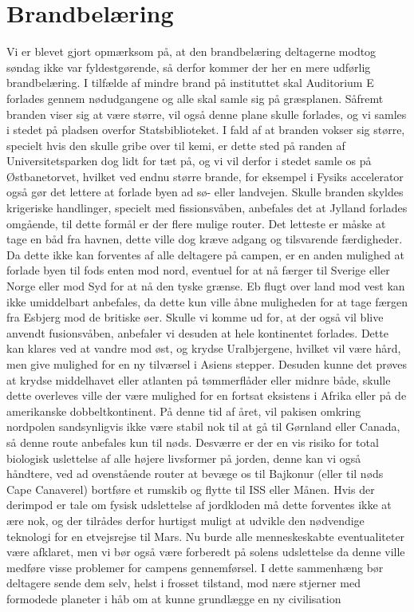 

\begin{minipage}[b]{0.95\linewidth}
\begin{minipage}[t]{0.47\textwidth}
\vspace{3mm}
\section*{Brandbelæring}
Vi er blevet gjort opmærksom på, at den brandbelæring deltagerne modtog søndag ikke var fyldestgørende, så derfor kommer der her en mere udførlig brandbelæring. I tilfælde af mindre brand på instituttet skal Auditorium E forlades gennem nødudgangene og alle skal samle sig på græsplanen. Såfremt branden viser sig at være større, vil også denne plane skulle forlades, og vi samles i stedet på pladsen overfor Statsbiblioteket. I fald af at branden vokser sig større, specielt hvis den skulle gribe over til kemi, er dette sted på randen af Universitetsparken dog lidt for tæt på, og vi vil derfor i stedet samle os på Østbanetorvet, hvilket ved endnu større brande, for eksempel i Fysiks accelerator også gør det lettere at forlade byen ad sø- eller landvejen. Skulle branden skyldes krigeriske handlinger, specielt med fissionsvåben, anbefales det at Jylland forlades omgående, til dette formål er der flere mulige router. Det letteste er måske at tage en båd fra havnen, dette ville dog kræve adgang og tilsvarende færdigheder. Da dette ikke kan forventes af alle deltagere på campen, er en anden mulighed at forlade byen til fods enten mod nord, eventuel for at nå færger til Sverige eller Norge eller mod Syd for at nå den tyske grænse. Eb flugt over land mod vest kan ikke umiddelbart anbefales, da dette kun ville åbne muligheden for at tage færgen fra Esbjerg mod de britiske øer. Skulle vi komme ud for, at der også vil blive anvendt fusionsvåben, anbefaler vi desuden at hele kontinentet forlades. Dette kan klares ved at vandre mod øst, og krydse Uralbjergene, hvilket vil være hård, men give mulighed for en ny tilværsel i Asiens stepper. Desuden kunne det prøves at krydse middelhavet eller atlanten på tømmerflåder eller midnre både, skulle dette overleves ville der være mulighed for en fortsat eksistens i Afrika eller på de amerikanske dobbeltkontinent. På denne tid af året, vil pakisen omkring nordpolen sandsynligvis ikke være stabil nok til at gå til Gørnland eller Canada, så denne route anbefales kun til nøds. Desværre er der en vis risiko for total biologisk uslettelse af alle højere livsformer på jorden, denne kan vi også håndtere, ved ad ovenstående router at bevæge os til Bajkonur (eller til nøds Cape Canaverel) bortføre et rumskib og flytte til ISS eller Månen. Hvis der derimpod er tale om fysisk udslettelse af jordkloden må dette forventes ikke at ære nok, og der tilrådes derfor hurtigst muligt at udvikle den nødvendige teknologi for en etvejsrejse til Mars. Nu burde alle menneskeskabte eventualiteter være afklaret, men vi bør også være forberedt på solens udslettelse da denne ville medføre visse problemer for campens gennemførsel. I dette sammenhæng bør deltagere sende dem selv, helst i frosset tilstand, mod nære stjerner med formodede planeter i håb om at kunne grundlægge en ny civilisation 
\end{minipage}
\end{minipage}
